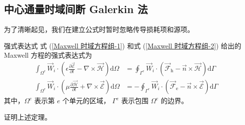 \subsection{中心通量时域间断 Galerkin 法}

\par 为了清晰起见，我们在建立公式时暂时忽略传导损耗项和源项。

\begin{theorem}{强式表达式}
    式 (\ref{Maxwell 时域方程组-1}) 
    和式 (\ref{Maxwell 时域方程组-2}) 给出的 Maxwell 方程的强式表达式为
    \begin{align}
        \label{时域间断 Galerkin 法强式表达式-1}
        \int_{\Omega^e}\vec{W}_i\cdot\left(
            \epsilon\frac{\partial\vec{\mathscr{E}}}{\partial t}
            -\nabla\times\vec{\mathscr{H}}
        \right)\text{d}\Omega
        &=\oint_{\Gamma^e}\vec{W}_i\cdot
        (\vec{\mathscr{F}}_{\text{h}}-\vec{n}\times\vec{\mathscr{H}})\text{d}\Gamma\\
        \label{时域间断 Galerkin 法强式表达式-2}
        \int_{\Omega^e}\vec{W}_i\cdot\left(
            \mu\frac{\partial\vec{\mathscr{H}}}{\partial t}
            +\nabla\times\vec{\mathscr{E}}
        \right)\text{d}\Omega
        &=-\oint_{\Gamma^e}\vec{W}_i\cdot
        (\vec{\mathscr{F}}_{\text{e}}-\vec{n}\times\vec{\mathscr{E}})\text{d}\Gamma
    \end{align}
    其中，$\Omega^e$ 表示第 $e$ 个单元的区域，
    $\Gamma^e$ 表示包围 $\Omega^e$ 的边界。
\end{theorem}

\begin{exercise}
    证明上述定理。
\end{exercise}

